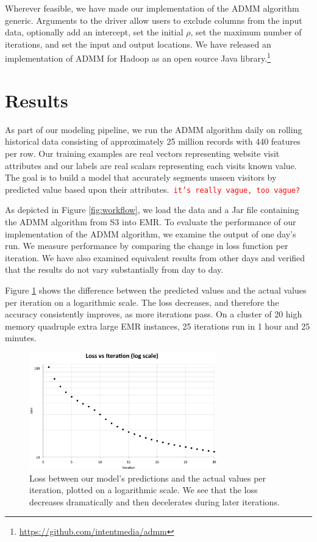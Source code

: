 \documentclass[10pt, conference, compsocconf]{IEEEtran}
\newcommand{\todo}[1]{\texttt{\textcolor{red}{#1}}}
\begin{document}
Wherever feasible, we have made our implementation of the ADMM algorithm generic.  Arguments to the driver allow users to exclude columns from the input data, optionally add an intercept, set the initial $\rho$, set the maximum number of iterations, and set the input and output locations. We have released an implementation of ADMM for Hadoop as an open source Java library.\footnote{\url{https://github.com/intentmedia/admm}}

\section{Results}\label{sec:results}
As part of our modeling pipeline, we run the ADMM algorithm daily on rolling historical data consisting of approximately 25 million records with 440 features per row.  Our training examples are real vectors representing website visit attributes and our labels are real scalars representing each visits known value.  The goal is to build a model that accurately segments unseen visitors by predicted value based upon their attributes.\todo{ it's really vague, too vague?}

As depicted in Figure \ref{fig:workflow}, we load the data and a Jar file containing the ADMM algorithm from S3 into EMR.  To evaluate the performance of our implementation of the ADMM algorithm, we examine the output of one day's run.  We measure performance by comparing the change in loss function per iteration.  We have also examined equivalent results from other days and verified that the results do not vary substantially from day to day.

Figure \ref{fig:iter} shows the difference between the predicted values and the actual values per iteration on a logarithmic scale.  The loss decreases, and therefore the accuracy consistently improves, as more iterations pass.  On a cluster of 20 high memory quadruple extra large EMR instances, 25 iterations run in 1 hour and 25 minutes.

\begin{figure}[!t]
\centering
\includegraphics[width=3.2in]{iter_rnorm_plot}
\caption{Loss between our model's predictions and the actual values per iteration, plotted on a logarithmic scale.  We see that the loss decreases dramatically and then decelerates during later iterations.}
\label{fig:iter}
\end{figure}
\end{document}
